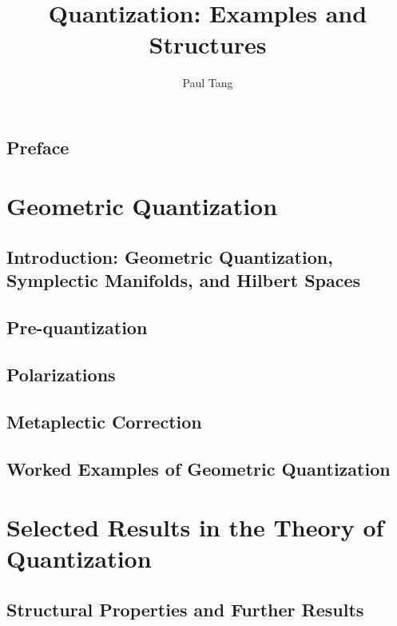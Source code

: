 \documentclass{amsbook} %
\title{Quantization: Examples and Structures}
\author{Paul Tang}
\theoremstyle{definition}
\theoremstyle{definition}
\begin{document}
\frontmatter

\maketitle

\tableofcontents

\chapter{Preface}



\part{Geometric Quantization}

\chapter{Introduction: Geometric Quantization, Symplectic Manifolds, and Hilbert Spaces}


\chapter{Pre-quantization}


\chapter{Polarizations}


\chapter{Metaplectic Correction}


\chapter{Worked Examples of Geometric Quantization}


\part{Selected Results in the Theory of Quantization}

\chapter{Structural Properties and Further Results}

\end{document}
